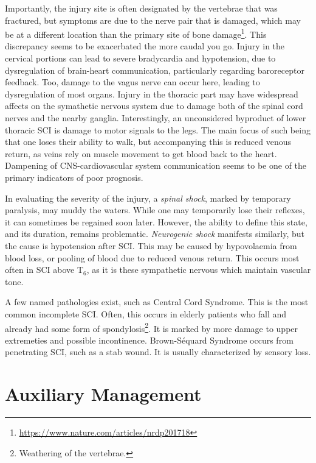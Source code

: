 \documentclass[12pt]{report}
\begin{document}
Importantly, the injury site is often designated by the vertebrae that was fractured, but symptoms are due to the nerve pair that is damaged, which may be at a different location than the primary site of bone damage\footnote{\url{https://www.nature.com/articles/nrdp201718}}. This discrepancy seems to be exacerbated the more caudal you go. Injury in the cervical portions can lead to severe bradycardia and hypotension, due to dysregulation of brain-heart communication, particularly regarding baroreceptor feedback. Too, damage to the vagus nerve can occur here, leading to dysregulation of most organs. Injury in the thoracic part may have widespread affects on the symathetic nervous system due to damage both of the spinal cord nerves and the nearby ganglia. Interestingly, an unconsidered byproduct of lower thoracic SCI is damage to motor signals to the legs. The main focus of such being that one loses their ability to walk, but accompanying this is reduced venous return, as veins rely on muscle movement to get blood back to the heart. Dampening of CNS-cardiovascular system communication seems to be one of the primary indicators of poor prognosis.\newline

In evaluating the severity of the injury, a \textit{spinal shock}, marked by temporary paralysis, may muddy the waters. While one may temporarily lose their reflexes, it can sometimes be regained soon later. However, the ability to define this state, and its duration, remains problematic. \textit{Neurogenic shock} manifests similarly, but the cause is hypotension after SCI. This may be caused by hypovolaemia from blood loss, or pooling of blood due to reduced venous return. This occurs most often in SCI above T$_6$, as it is these sympathetic nervous which maintain vascular tone.\newline

A few named pathologies exist, such as Central Cord Syndrome. This is the most common incomplete SCI. Often, this occurs in elderly patients who fall and already had some form of spondylosis\footnote{Weathering of the vertebrae.}. It is marked by more damage to upper extremeties and possible incontinence. Brown-Séquard Syndrome occurs from penetrating SCI, such as a stab wound. It is usually characterized by sensory loss. 

\section{Auxiliary Management}
\end{document}
